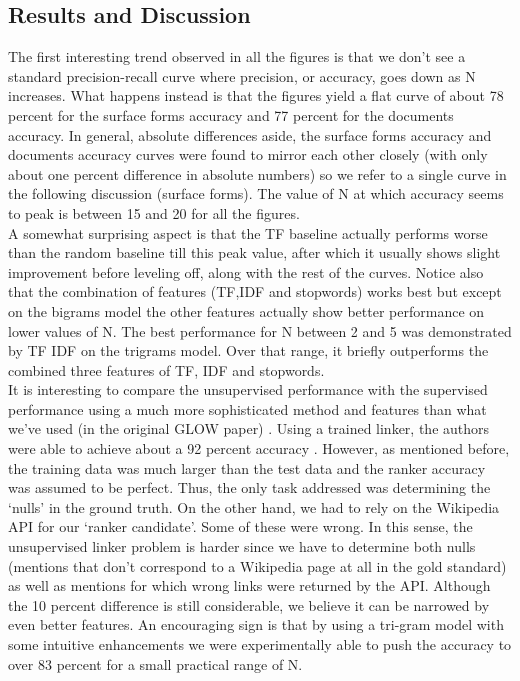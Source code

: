 \subsection{Results and Discussion}
The first interesting trend observed in all the figures is that we don't see a standard precision-recall curve where precision, or accuracy, goes down as N increases. What happens instead is that the figures yield a flat curve of about 78 percent for the surface forms accuracy and 77 percent for the documents accuracy. In general, absolute differences aside, the surface forms accuracy and documents accuracy curves were found to mirror each other closely (with only about one percent difference in absolute numbers) so we refer to a single curve in the following discussion (surface forms). The value of N at which accuracy seems to peak is between 15 and 20 for all the figures. \\
A somewhat surprising aspect is that the TF baseline actually performs worse than the random baseline till this peak value, after which it usually shows slight improvement before leveling off, along with the rest of the curves. Notice also that the combination of features (TF,IDF and stopwords) works best but except on the bigrams model the other features actually show better performance on lower values of N. The best performance for N between 2 and 5 was demonstrated by TF IDF on the trigrams model. Over that range, it briefly outperforms the combined three features of TF, IDF and stopwords.\\
It is interesting to compare the unsupervised performance with the supervised performance using a much more sophisticated method and features than what we've used (in the original GLOW paper) \cite{roth}. Using a trained linker, the authors were able to achieve about a 92 percent accuracy . However, as mentioned before, the training data was much larger than the test data and the ranker accuracy was assumed to be perfect. Thus, the only task addressed was determining the `nulls' in the ground truth. On the other hand, we had to rely on the Wikipedia API for our `ranker candidate'. Some of these were wrong. In this sense, the unsupervised linker problem is harder since we have to determine both nulls (mentions that don't correspond to a Wikipedia page at all in the gold standard) as well as mentions for which wrong links were returned by the API. Although the 10 percent difference is still considerable, we believe it can be narrowed by even better features.  An encouraging sign is that by using a tri-gram model with some intuitive enhancements we were experimentally able to push the accuracy to over 83 percent for a small practical range of N. 

